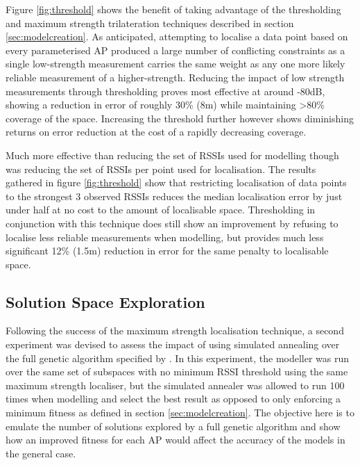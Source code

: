 \documentclass{UoYCSproject}
\begin{document}
                Figure \ref{fig:threshold} shows the benefit of taking advantage of the thresholding and maximum strength trilateration techniques described in section \ref{sec:modelcreation}. As anticipated, attempting to localise a data point based on every parameterised AP produced a large number of conflicting constraints as a single low-strength measurement carries the same weight as any one more likely reliable measurement of a higher-strength. Reducing the impact of low strength measurements through thresholding proves most effective at around -80dB, showing a reduction in error of roughly 30\% (8m) while maintaining >80\% coverage of the space. Increasing the threshold further however shows diminishing returns on error reduction at the cost of a rapidly decreasing coverage.
                
                Much more effective than reducing the set of RSSIs used for modelling though was reducing the set of RSSIs per point used for localisation. The results gathered in figure \ref{fig:threshold} show that restricting localisation of data points to the strongest 3 observed RSSIs reduces the median localisation error by just under half at no cost to the amount of localisable space. Thresholding in conjunction with this technique does still show an improvement by refusing to localise less reliable measurements when modelling, but provides much less significant 12\% (1.5m) reduction in error for the same penalty to localisable space.
                
            \subsection{Solution Space Exploration}
                
                Following the success of the maximum strength localisation technique, a second experiment was devised to assess the impact of using simulated annealing over the full genetic algorithm specified by \citet{chintalapudi2010indoor}. In this experiment, the modeller was run over the same set of subspaces with no minimum RSSI threshold using the same maximum strength localiser, but the simulated annealer was allowed to run 100 times when modelling and select the best result as opposed to only enforcing a minimum fitness as defined in section \ref{sec:modelcreation}. The objective here is to emulate the number of solutions explored by a full genetic algorithm and show how an improved fitness for each AP would affect the accuracy of the models in the general case.
                  
\end{document}
